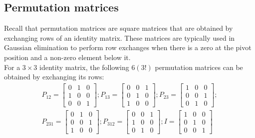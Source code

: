 \documentclass[../main.tex]{subfiles}
\begin{document}
    \subsection{Permutation matrices}
    Recall that permutation matrices are square matrices that are obtained by exchanging rows of an identity matrix. These matrices are typically used in Gaussian elimination to perform row exchanges when there is a zero at the pivot position and a non-zero element below it. \\

    For a $3 \times 3$ identity matrix, the following $6(3!)$ permutation matrices can be obtained by exchanging its rows:
    \[
        \begin{gathered}
            P_{12}
            =
            \begin{bmatrix}
                0 & 1 & 0 \\
                1 & 0 & 0 \\
                0 & 0 & 1
            \end{bmatrix};
            P_{13}
            =
            \begin{bmatrix}
                0 & 0 & 1 \\
                0 & 1 & 0 \\
                1 & 0 & 0
            \end{bmatrix};
            P_{23}
            =
            \begin{bmatrix}
                1 & 0 & 0 \\
                0 & 0 & 1 \\
                0 & 1 & 0
            \end{bmatrix}; \\
            P_{231}
            =
            \begin{bmatrix}
                0 & 1 & 0 \\
                0 & 0 & 1 \\
                1 & 0 & 0
            \end{bmatrix};
            P_{312}
            =
            \begin{bmatrix}
                0 & 0 & 1 \\
                1 & 0 & 0 \\
                0 & 1 & 0
            \end{bmatrix};
            I
            =
            \begin{bmatrix}
                1 & 0 & 0 \\
                0 & 1 & 0 \\
                0 & 0 & 1
            \end{bmatrix}
        \end{gathered}
    \]
\end{document}
